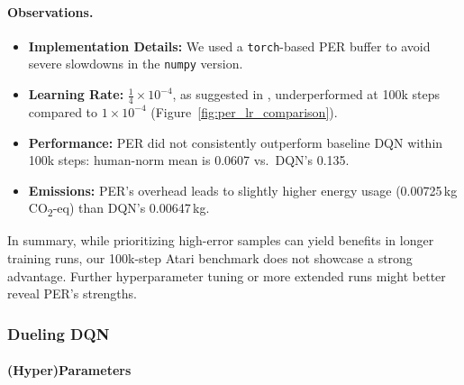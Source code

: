 \paragraph{Observations.}
\begin{itemize}
	\item \textbf{Implementation Details:} 
	We used a \texttt{torch}-based PER buffer to avoid severe slowdowns in the \texttt{numpy} version.
	\item \textbf{Learning Rate:} 
	$\tfrac{1}{4}\times10^{-4}$, as suggested in \cite{schaul:prioritized}, underperformed at 100k steps 
	compared to $1\times10^{-4}$ (Figure~\ref{fig:per_lr_comparison}).
	\item \textbf{Performance:} 
	PER did not consistently outperform baseline DQN within 100k steps: 
	human-norm mean is 0.0607 vs.\ DQN’s 0.135. 
	\item \textbf{Emissions:} 
	PER's overhead leads to slightly higher energy usage (0.00725\,kg CO\textsubscript{2}-eq) than DQN’s 0.00647\,kg.
\end{itemize}

In summary, while prioritizing high-error samples can yield benefits in longer training runs, 
our 100k-step Atari benchmark does not showcase a strong advantage. 
Further hyperparameter tuning or more extended runs might better reveal PER’s strengths.


\subsubsection{Dueling DQN}
\label{subsubsec:dueling_dqn}

\paragraph{(Hyper)Parameters}

